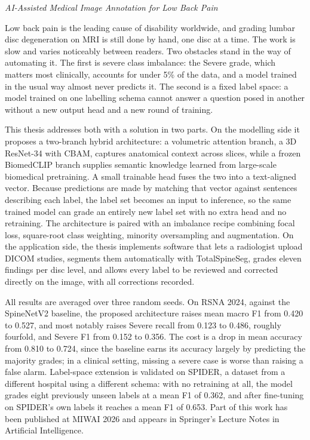 \documentclass[12pt]{report}
\begin{document}

\textit{AI-Assisted Medical Image Annotation for Low Back Pain}

Low back pain is the leading cause of disability worldwide, and grading lumbar disc degeneration on MRI is still done by hand, one disc at a time. The work is slow and varies noticeably between readers. Two obstacles stand in the way of automating it. The first is severe class imbalance: the Severe grade, which matters most clinically, accounts for under 5\% of the data, and a model trained in the usual way almost never predicts it. The second is a fixed label space: a model trained on one labelling schema cannot answer a question posed in another without a new output head and a new round of training.

This thesis addresses both with a solution in two parts. On the modelling side it proposes a two-branch hybrid architecture: a volumetric attention branch, a 3D ResNet-34 with CBAM, captures anatomical context across slices, while a frozen BiomedCLIP branch supplies semantic knowledge learned from large-scale biomedical pretraining. A small trainable head fuses the two into a text-aligned vector. Because predictions are made by matching that vector against sentences describing each label, the label set becomes an input to inference, so the same trained model can grade an entirely new label set with no extra head and no retraining. The architecture is paired with an imbalance recipe combining focal loss, square-root class weighting, minority oversampling and augmentation. On the application side, the thesis implements software that lets a radiologist upload DICOM studies, segments them automatically with TotalSpineSeg, grades eleven findings per disc level, and allows every label to be reviewed and corrected directly on the image, with all corrections recorded.

All results are averaged over three random seeds. On RSNA 2024, against the SpineNetV2 baseline, the proposed architecture raises mean macro F1 from 0.420 to 0.527, and most notably raises Severe recall from 0.123 to 0.486, roughly fourfold, and Severe F1 from 0.152 to 0.356. The cost is a drop in mean accuracy from 0.810 to 0.724, since the baseline earns its accuracy largely by predicting the majority grades; in a clinical setting, missing a severe case is worse than raising a false alarm. Label-space extension is validated on SPIDER, a dataset from a different hospital using a different schema: with no retraining at all, the model grades eight previously unseen labels at a mean F1 of 0.362, and after fine-tuning on SPIDER's own labels it reaches a mean F1 of 0.653. Part of this work has been published at MIWAI 2026 and appears in Springer's Lecture Notes in Artificial Intelligence.
\end{document}
